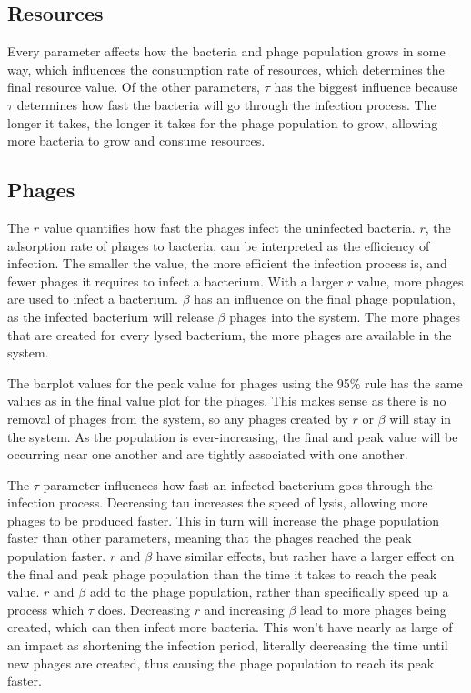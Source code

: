 \subsection{Resources}
Every parameter affects how the bacteria and phage population grows in some way, which influences the consumption rate of resources, which determines the final resource value. 
Of the other parameters, $\tau$ has the biggest influence because $\tau$ determines how fast the bacteria will go through the infection process. 
The longer it takes, the longer it takes for the phage population to grow, allowing more bacteria to grow and consume resources. 

\subsection{Phages}
The $r$ value quantifies how fast the phages infect the uninfected bacteria. 
$r$, the adsorption rate of phages to bacteria, can be interpreted as the efficiency of infection. 
The smaller the value, the more efficient the infection process is, and fewer phages it requires to infect a bacterium. 
With a larger $r$ value, more phages are used to infect a bacterium. 
$\beta$ has an influence on the final phage population, as the infected bacterium will release $\beta$ phages into the system. 
The more phages that are created for every lysed bacterium, the more phages are available in the system. 

The barplot values for the peak value for phages using the 95\% rule has the same values as in the final value plot for the phages. 
This makes sense as there is no removal of phages from the system, so any phages created by $r$ or $\beta$ will stay in the system. 
As the population is ever-increasing, the final and peak value will be occurring near one another and are tightly associated with one another.

The $\tau$ parameter influences how fast an infected bacterium goes through the infection process. 
Decreasing tau increases the speed of lysis, allowing more phages to be produced faster. 
This in turn will increase the phage population faster than other parameters, meaning that the phages reached the peak population faster.
$r$ and $\beta$ have similar effects, but rather have a larger effect on the final and peak phage population than the time it takes to reach the peak value. 
$r$ and $\beta$ add to the phage population, rather than specifically speed up a process which $\tau$ does. 
Decreasing $r$ and increasing $\beta$ lead to more phages being created, which can then infect more bacteria. 
This won't have nearly as large of an impact as shortening the infection period, literally decreasing the time until new phages are created, thus causing the phage population to reach its peak faster. 

